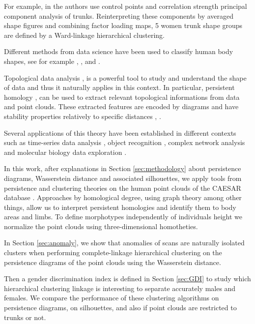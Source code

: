 \documentclass[twocolumn]{article}
\begin{document}
For example, in \cite{NK09} the authors use control points and correlation strength principal component analysis of trunks. Reinterpreting these components by averaged shape figures and combining factor loading maps, 5 women trunk shape groups are defined by a Ward-linkage hierarchical clustering.

Different methods from data science have been used to classify human body shapes, see for example \cite{C12}, \cite{HTB17}, \cite{NZHBNIS18} and \cite{PPA19}.
\vspace{0.2cm}

Topological data analysis \cite{CM21}, \cite{M17} is a powerful tool to study and understand the shape of data and thus it naturally applies in this context. In particular, persistent homology \cite{ELZ02}, \cite{ZC05} can be used to extract relevant topological informations from data and point clouds. These extracted features are encoded by diagrams and have stability properties relatively to specific distances \cite{CSEHH05}, \cite{CCSGGO09}.

Several applications of this theory have been established in different contexts such as time-series data analysis \cite{UKK19}, object recognition \cite{LOC14}, complex network analysis \cite{HMR09} and molecular biology data exploration \cite{YSHBSLGPC09}.
\vspace{0.2cm}

In this work, after explanations in Section \ref{sec:methodology} about persistence diagrams, Wasserstein distance and associated silhouettes, we apply tools from persistence and clustering theories on the human point clouds of the CAESAR database \cite{YYZDDY14}. Approaches by homological degree, using graph theory among other things, allow us to interpret persistent homologies and identify them to body areas and limbs. To define morphotypes independently of individuals height we normalize the point clouds using three-dimensional homotheties.

In Section \ref{sec:anomaly}, we show that anomalies of scans are naturally isolated clusters when performing complete-linkage hierarchical clustering on the persistence diagrams of the point clouds using the Wasserstein distance.

Then a gender discrimination index is defined in Section \ref{sec:GDI} to study which hierarchical clustering linkage is interesting to separate accurately males and females. We compare the performance of these clustering algorithms on persistence diagrams, on silhouettes, and also if point clouds are restricted to trunks or not.
\end{document}
